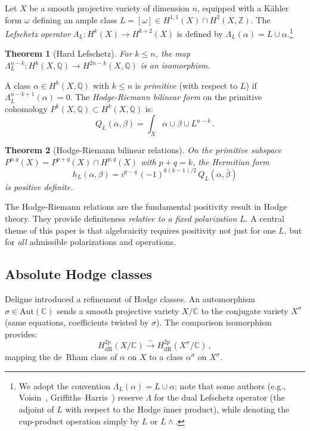 \documentclass[aps,prd,twocolumn,superscriptaddress,nofootinbib]{revtex4-2}
\newtheorem{theorem}{Theorem}[section]
\theoremstyle{definition}
\theoremstyle{remark}
\begin{document}
Let $X$ be a smooth projective variety of dimension $n$, equipped with a K\"ahler form $\omega$ defining an ample class $L = [\omega] \in H^{1,1}(X) \cap H^2(X, \mathbb{Z})$. The \textit{Lefschetz operator} $\Lambda_L: H^k(X) \to H^{k+2}(X)$ is defined by $\Lambda_L(\alpha) = L \cup \alpha$.\footnote{We adopt the convention $\Lambda_L(\alpha) = L \cup \alpha$; note that some authors (e.g., Voisin~\cite{Voisin2002}, Griffiths--Harris~\cite{GH1978}) reserve $\Lambda$ for the dual Lefschetz operator (the adjoint of $L$ with respect to the Hodge inner product), while denoting the cup-product operation simply by $L$ or $L \wedge$.}

\begin{theorem}[Hard Lefschetz]
\label{thm:hard_lefschetz}
For $k \leq n$, the map $\Lambda_L^{n-k}: H^k(X, \mathbb{Q}) \to H^{2n-k}(X, \mathbb{Q})$ is an isomorphism.
\end{theorem}

A class $\alpha \in H^k(X, \mathbb{Q})$ with $k \leq n$ is \textit{primitive} (with respect to $L$) if $\Lambda_L^{n-k+1}(\alpha) = 0$. The \textit{Hodge-Riemann bilinear form} on the primitive cohomology $P^k(X, \mathbb{Q}) \subset H^k(X, \mathbb{Q})$ is:
\begin{equation}
Q_L(\alpha, \beta) = \int_X \alpha \cup \beta \cup L^{n-k}\,.
\label{eq:HR_form}
\end{equation}

\begin{theorem}[Hodge-Riemann bilinear relations]
\label{thm:HR}
On the primitive subspace $P^{p,q}(X) = P^{p+q}(X) \cap H^{p,q}(X)$ with $p + q = k$, the Hermitian form
\begin{equation}
h_L(\alpha, \beta) = i^{p-q}\,(-1)^{k(k-1)/2}\, Q_L(\alpha, \bar{\beta})
\label{eq:HR_hermitian}
\end{equation}
is positive definite.
\end{theorem}

The Hodge-Riemann relations are the fundamental positivity result in Hodge theory. They provide definiteness \textit{relative to a fixed polarization} $L$. A central theme of this paper is that algebraicity requires positivity not just for one $L$, but for \textit{all} admissible polarizations and operations.

\subsection{Absolute Hodge classes}

Deligne \cite{Deligne1982} introduced a refinement of Hodge classes. An automorphism $\sigma \in \mathrm{Aut}(\mathbb{C})$ sends a smooth projective variety $X/\mathbb{C}$ to the conjugate variety $X^\sigma$ (same equations, coefficients twisted by $\sigma$). The comparison isomorphism provides:
\begin{equation}
H^{2p}_{\mathrm{dR}}(X/\mathbb{C}) \xrightarrow{\sim} H^{2p}_{\mathrm{dR}}(X^\sigma/\mathbb{C})\,,
\end{equation}
mapping the de~Rham class of $\alpha$ on $X$ to a class $\alpha^\sigma$ on $X^\sigma$.
\end{document}
